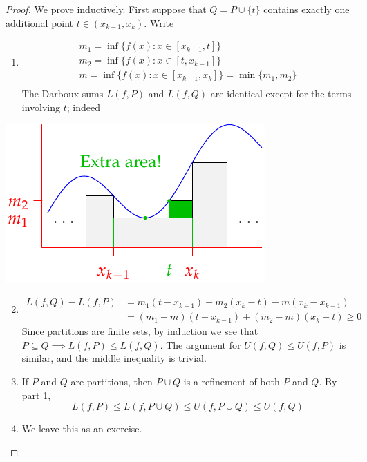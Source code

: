 \begin{proof}
\exstart We prove inductively. First suppose that $Q=P\cup\{t\}$ contains exactly one additional point $t\in(x_{k-1},x_k)$. Write\par
\begin{minipage}[t]{0.6\linewidth}\vspace{-15pt}
\begin{enumerate}
  \item[]\begin{gather*}
  m_1=\inf\{f(x):x\in[x_{k-1},t]\}\\
  m_2=\inf\{f(x):x\in[t,x_{k-1}]\}\\
  m=\inf\{f(x):x\in[x_{k-1},x_k]\}=\min\{m_1,m_2\}\\[-15pt]
  \end{gather*}
  The Darboux sums $L(f,P)$ and $L(f,Q)$ are identical except for the terms involving $t$; indeed
  \end{enumerate}
\end{minipage}\begin{minipage}[t]{0.4\linewidth}\vspace{-17pt}
\flushright\includegraphics{riemann-sum3}
\end{minipage}\par\vspace{-17pt}
\begin{enumerate}\setcounter{enumi}{1}
  \item[]\begin{align*}
  L(f,Q)-L(f,P) &=m_1(t-x_{k-1}) +m_2(x_{k}-t) -m(x_k-x_{k-1})\\
  &=(m_1-m)(t-x_{k-1}) +(m_2-m)(x_k-t)\ge 0
  \end{align*}
  Since partitions are finite sets, by induction we see that $P\subseteq Q\implies L(f,P)\le L(f,Q)$.\smallbreak
  The argument for $U(f,Q)\le U(f,P)$ is similar, and the middle inequality is trivial.
  
  \item If $P$ and $Q$ are partitions, then $P\cup Q$ is a refinement of both $P$ and $Q$. By part 1,
  \[L(f,P)\le L(f,P\cup Q)\le U(f,P\cup Q)\le U(f,Q)\tag{$\ast$}\]
  
	\item We leave this as an exercise.\qedhere
\end{enumerate}
\end{proof}

